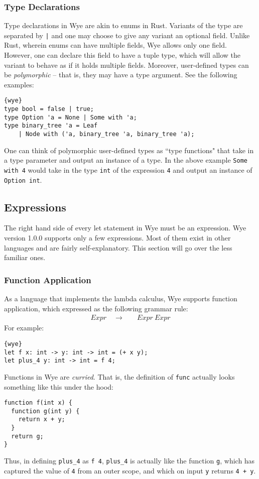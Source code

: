\documentclass[a4paper, 12pt]{article}
\theoremstyle{myplain}
\theoremstyle{mydefinition}
\theoremstyle{myremark}
\numberwithin{equation} {section}
\numberwithin{figure}   {section}
\numberwithin{table}    {section}
\newcommand{\substo}{\quad\rightarrow\quad}
\newcommand{\version}{1.0.0}
\begin{document}
\subsubsection{Type Declarations}
Type declarations in Wye are akin to enums in Rust. Variants of the type are separated by \texttt{|} and one may choose to give any variant an optional field. Unlike Rust, wherein enums can have multiple fields, Wye allows only one field. However, one can declare this field to have a tuple type, which will allow the variant to behave as if it holds multiple fields. Moreover, user-defined types can be \textit{polymorphic} -- that is, they may have a type argument. See the following examples:
\begin{lstlisting}{wye}
type bool = false | true;
type Option 'a = None | Some with 'a;
type binary_tree 'a = Leaf
	| Node with ('a, binary_tree 'a, binary_tree 'a);
\end{lstlisting}
One can think of polymorphic user-defined types as ``type functions" that take in a type parameter and output an instance of a type. In the above example \texttt{Some with 4} would take in the type \texttt{int} of the expression \texttt{4} and output an instance of \texttt{Option int}.

\subsection{Expressions}
The right hand side of every let statement in Wye must be an expression. Wye version \version{} supports only a few expressions. Most of them exist in other languages and are fairly self-explanatory. This section will go over the less familiar ones.

\subsubsection{Function Application}
As a language that implements the lambda calculus, Wye supports function application, which expressed as the following grammar rule:
\begin{align*}
Expr\substo& Expr\: Expr
\end{align*}
For example:
\begin{lstlisting}{wye}
let f x: int -> y: int -> int = (+ x y);
let plus_4 y: int -> int = f 4;
\end{lstlisting}
Functions in Wye are \textit{curried}. That is, the definition of \texttt{func} actually looks something like this under the hood:
\begin{verbatim}
function f(int x) {
  function g(int y) {
    return x + y;
  }
  return g;
}
\end{verbatim}
Thus, in defining \texttt{plus\_4} as \texttt{f 4}, \texttt{plus\_4} is actually like the function \texttt{g}, which has captured the value of \texttt{4} from an outer scope, and which on input \texttt{y} returns \texttt{4 + y}.
\end{document}
